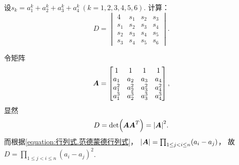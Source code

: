 \begin{example}
设\(s_k = a_1^k + a_2^k + a_3^k + a_4^k\ (k=1,2,3,4,5,6)\).
计算：\[
	D = \begin{vmatrix}
		4 & s_1 & s_2 & s_3 \\
		s_1 & s_2 & s_3 & s_4 \\
		s_2 & s_3 & s_4 & s_5 \\
		s_3 & s_4 & s_5 & s_6
	\end{vmatrix}.
\]
\begin{solution}
令矩阵\[
	\boldsymbol{A} = \begin{bmatrix}
		1 & 1 & 1 & 1 \\
		a_1 & a_2 & a_3 & a_4 \\
		a_1^2 & a_2^2 & a_3^2 & a_4^2 \\
		a_1^3 & a_2^3 & a_3^3 & a_4^3
	\end{bmatrix},
\]
显然\[
	D = \det(\boldsymbol{A} \boldsymbol{A}^T) = \abs{\boldsymbol{A}}^2.
\]
而根据\cref{equation:行列式.范德蒙德行列式}，
\(\abs{\boldsymbol{A}}
= \prod_{1 \leq j < i \leq n} (a_i - a_j)\)，
故\(D = \prod_{1 \leq j < i \leq n} (a_i - a_j)^2\).
\end{solution}
\end{example}
